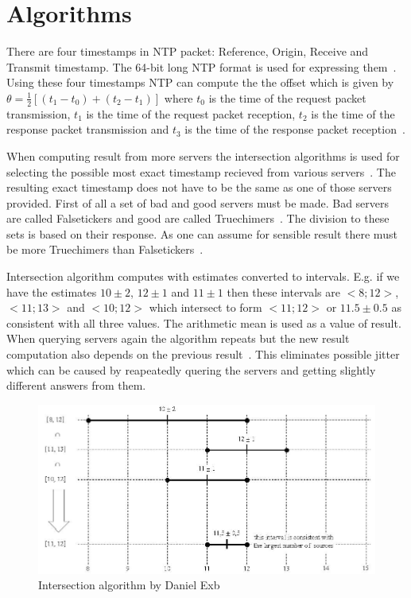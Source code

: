 
\section{Algorithms}


There are four timestamps in NTP packet: Reference, Origin, Receive and Transmit timestamp.
The 64-bit long NTP format is used for expressing them~\cite{rfc5905}.
Using these four timestamps NTP can compute the
the offset which is given by $\theta = \frac{1}{2}[(t_1 - t_0) + (t_2 - t_1)]$
where $t_0$ is the time of the request packet transmission,
$t_1$ is the time of the request packet reception,
$t_2$ is the time of the response packet transmission and
$t_3$ is the time of the response packet reception~\cite{ntp-algor}.

When computing result from more servers the intersection algorithms is used
for selecting the possible most exact timestamp recieved from various servers~\cite{rfc5905}.
The resulting exact timestamp does not have to be the same
as one of those servers provided.
First of all a set of bad and good servers must be made.
Bad servers are called Falsetickers and good are called Truechimers~\cite{rfc5905}.
The division to these sets is based on their response.
As one can assume for sensible result there must be more Truechimers than Falsetickers~\cite{rfc5905}.

Intersection algorithm computes with estimates converted to intervals.
E.g. if we have the estimates $10 \pm 2$, $12 \pm 1$ and $11 \pm 1$
then these intervals are $<8; 12>$, $<11; 13>$ and $<10; 12>$ which
intersect to form $<11; 12>$ or $11.5 \pm 0.5$ as consistent with all three values.
The arithmetic mean is used as a value of result.
When querying servers again the algorithm repeats but the new result computation
also depends on the previous result~\cite{rfc5905}.
This eliminates possible jitter which can be caused by reapeatedly quering the servers
and getting slightly different answers from them.

\begin{figure}
	\centering
	\includegraphics[width=13cm,keepaspectratio]{fig/Marzullo_example-1.jpg}
	\caption{Intersection algorithm by Daniel Exb}
	\label{fig:ntp-intersection}
	\bigskip
\end{figure}

